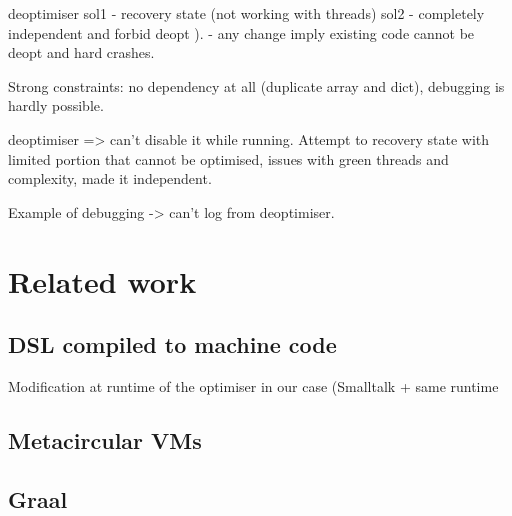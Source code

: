 \documentclass[a4paper,12pt,twoside]{../includes/ThesisStyle}
\begin{document}
deoptimiser
sol1
- recovery state (not working with threads)
sol2
- completely independent and forbid deopt
).
- any change imply existing code cannot be deopt and hard crashes.

Strong constraints: no dependency at all (duplicate array and dict), debugging is hardly possible.

deoptimiser => can't disable it while running. Attempt to recovery state with limited portion that cannot be optimised, issues with green threads and complexity, made it independent.

Example of debugging -> can't log from deoptimiser. 

\section{Related work}

\subsection{DSL compiled to machine code}

Modification at runtime of the optimiser in our case (Smalltalk + same runtime

\subsection{Metacircular VMs}

\subsection{Graal}

\ifx\wholebook\relax\else
    
\end{document}
